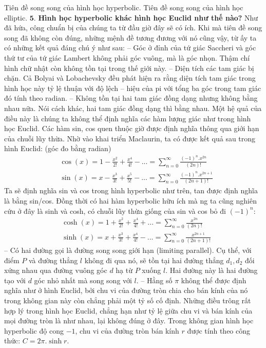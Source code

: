 \documentclass{article}
\begin{document}
	\vskip 0.1cm
	Tiên đề song song của hình học hyperbolic. 
	\vskip 0.1cm
	Tiên đề song song của hình học elliptic.
	\vskip 0.1cm
	$\pmb{5.}$ \textbf{\color{lichsutoanhoc}Hình học hyperbolic khác hình học Euclid như thế nào?}
	\vskip 0.1cm
	Như đã hứa, công chuẩn bị của chúng ta từ đầu giờ đây sẽ có ích. Khi mà tiên đề song song đã không còn đúng, những mệnh đề tương đương với nó cũng vậy, từ ấy ta có những kết quả đáng chú ý như sau:
	\vskip 0.1cm
	-- Góc ở đỉnh của tứ giác Saccheri và góc thứ tư của tứ giác Lambert không phải góc vuông, mà là góc nhọn. Thậm chí hình chữ nhật còn không tồn tại trong thế giới này. 
	\vskip 0.1cm
	-- Diện tích các tam giác bị chặn. Cả Bolyai và Lobachevsky đều phát hiện ra rằng diện tích tam giác trong hình học này tỷ lệ thuận với độ lệch -- hiệu của pi với tổng ba góc trong tam giác đó tính theo radian.
	\vskip 0.1cm
	-- Không tồn tại hai tam giác đồng dạng nhưng không bằng nhau nữa. Nói cách khác, hai tam giác đồng dạng thì bằng nhau. 
	\vskip 0.1cm
	Một hệ quả của điều này là chúng ta không thể định nghĩa các hàm lượng giác như trong hình học Euclid. Các hàm sin, cos quen thuộc giờ được định nghĩa thông qua giới hạn của chuỗi lũy thừa. Nhờ vào khai triển Maclaurin, ta có được kết quả sau trong hình Euclid: (góc đo bằng radian)
	\begin{align*}
		&\cos(x) =  1 - \frac{x^2}{2!} + \frac{x^4}{4!} - ... = \sum_{n=0}^{\infty} \frac{(-1)^n.x^{2n}}{(2n)!} \\
		&\sin(x) =  x - \frac{x^3}{3!} + \frac{x^5}{5!} - ... = \sum_{n=0}^{\infty} \frac{(-1)^n.x^{2n+1}}{(2n+1)!}
	\end{align*}
	Ta sẽ định nghĩa sin và cos trong hình hyperbolic như trên, tan được định nghĩa là bằng sin/cos.
	Đồng thời có hai hàm hyperbolic hữu ích mà ng ta cũng nghiên cứu ở đây là sinh và cosh, có chuỗi lũy thừa giống của sin và cos bỏ đi $(-1)^n$:
	\begin{align*}
		&\cosh(x) =  1 + \frac{x^2}{2!} + \frac{x^4}{4!} + ... = \sum_{n=0}^{\infty} \frac{x^{2n}}{(2n)!} \\
		&\sinh(x) =  x + \frac{x^3}{3!} + \frac{x^4}{4!} - ... = \sum_{n=0}^{\infty} \frac{x^{2n+1}}{(2n+1)!}
	\end{align*}
	-- Có hai đường gọi là đường song song giới hạn (limiting parallel). Cụ thể, với điểm $P$ và đường thẳng $l$ không đi qua nó, sẽ tồn tại hai đường thẳng $d_1, d_2$ đối xứng nhau qua đường vuông góc $d$ hạ từ $P$ xuống $l$. Hai đường này là hai đường tạo với $d$ góc nhỏ nhất mà song song với $l$. 
	\vskip 0.1cm
	-- Hằng số $\pi$  không thể được định nghĩa như ở hình Euclid, bởi chu vi của đường tròn chia cho bán kính của nó trong không gian này còn chẳng phải một tỷ số cố định. Những điều trông rất hợp lý trong hình học Euclid, chẳng hạn như tỷ lệ giữa chu vi và bán kính của mọi đường tròn là như nhau, lại không đúng ở đây. Trong không gian hình học hyperbolic độ cong $-1$, chu vi của đường tròn bán kính $r$ được tính theo công thức: $C = 2\pi.\sinh r$. 
\end{document}
